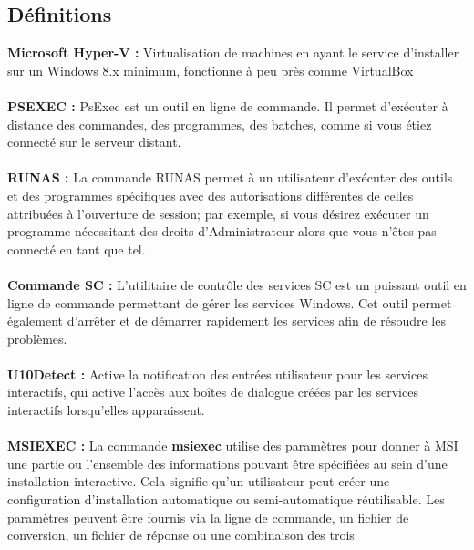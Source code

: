 \documentclass[11pt,a4paper,oneside]{article}
\begin{document}
\subsection{Définitions}
\textbf{Microsoft Hyper-V :} Virtualisation de machines en ayant le service d'installer sur un Windows 8.x minimum, fonctionne à peu près comme VirtualBox
\\ \\
\textbf{PSEXEC :} PsExec est un outil en ligne de commande. Il permet d’exécuter à distance des commandes, des programmes, des batches, comme si vous étiez connecté sur le serveur distant.
\\ \\
\textbf{RUNAS :} La commande RUNAS permet à un utilisateur d'exécuter des outils et des programmes spécifiques avec des autorisations différentes de celles attribuées à l'ouverture de session; par exemple, si vous désirez exécuter un programme nécessitant des droits d'Administrateur alors que vous n'êtes pas connecté en tant que tel.
\\ \\
\textbf{Commande SC :} L'utilitaire de contrôle des services SC est un puissant outil en ligne de commande permettant de gérer les services Windows. Cet outil permet également d'arrêter et de démarrer rapidement les services afin de résoudre les problèmes.
\\ \\
\textbf{U10Detect :} Active la notification des entrées utilisateur pour les services interactifs, qui active l'accès aux boîtes de dialogue créées par les services interactifs lorsqu'elles apparaissent.
\\ \\
\textbf{MSIEXEC :} La commande \textbf{msiexec} utilise des paramètres pour donner à MSI une partie ou l'ensemble des informations pouvant être spécifiées au sein d'une installation interactive. Cela signifie qu'un utilisateur peut créer une configuration d'installation automatique ou semi-automatique réutilisable. Les paramètres peuvent être fournis via la ligne de commande, un fichier de conversion, un fichier de réponse ou une combinaison des trois
\newpage
\end{document}
